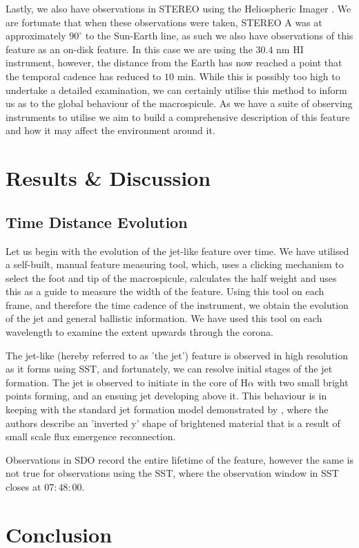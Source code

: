 \documentclass{emulateapj}
\begin{document}
Lastly, we also have observations in STEREO using the Heliospheric Imager \citep{Defise2001}. 
We are fortunate that when these observations were taken, STEREO A was at approximately $90^\circ$ to the Sun-Earth line, as such we also have observations of this feature as an on-disk feature.
In this case we are using the $30.4$ nm HI instrument, however, the distance from the Earth has now reached a point that the temporal cadence has reduced to $10$ min.
While this is possibly too high to undertake a detailed examination, we can certainly utilise this method to inform us as to the global behaviour of the macrospicule.
As we have a suite of observing instruments to utilise we aim to build a comprehensive description of this feature and how it may affect the environment around it.



\section{Results \& Discussion}



\subsection{Time Distance Evolution}
Let us begin with the evolution of the jet-like feature over time. 
We have utilised a self-built, manual feature measuring tool, which, uses a clicking mechanism to select the foot and tip of the macrospicule, calculates the half weight and uses this as a guide to measure the width of the feature.
Using this tool on each frame, and therefore the time cadence of the instrument, we obtain the evolution of the jet and general ballistic information.
We have used this tool on each wavelength to examine the extent upwards through the corona. 

The jet-like (hereby referred to as 'the jet') feature is observed in high resolution as it forms using SST, and fortunately, we can resolve initial stages of the jet formation.
The jet is observed to initiate in the core of H$\alpha$ with two small bright points forming, and an ensuing jet developing above it. 
This behaviour is in keeping with the standard jet formation model demonstrated by \cite{Shibata1992}, where the authors describe an 'inverted y' shape of brightened material that is a result of small scale flux emergence reconnection.

Observations in SDO record the entire lifetime of the feature, however the same is not true for observations using the SST, where the observation window in SST closes at $07:48:00$.



\section{Conclusion}





\end{document}
